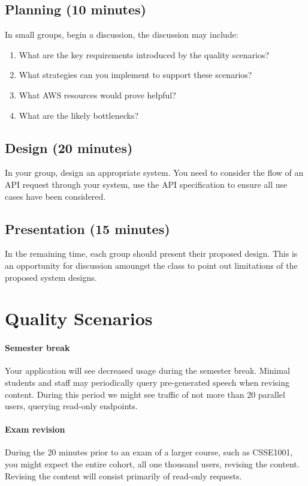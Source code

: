\documentclass{csse4400}
\begin{document}
\subsection*{Planning (10 minutes)}
In small groups, begin a discussion,
the discussion may include:

\begin{enumerate}
    \item What are the key requirements introduced by the quality scenarios?
    \item What strategies can you implement to support these scenarios?
    \item What AWS resources would prove helpful?
    \item What are the likely bottlenecks?
\end{enumerate}

\subsection*{Design (20 minutes)}

In your group, design an appropriate system.
You need to consider the flow of an API request through your system,
use the API specification to ensure all use cases have been considered.

\subsection*{Presentation (15 minutes)}

In the remaining time,
each group should present their proposed design.
This is an opportunity for discussion amoungst the class to point out limitations of the proposed system designs.

\section{Quality Scenarios}\label{sec:scenarios}

\paragraph{Semester break}
Your application will see decreased usage during the semester break.
Minimal students and staff may periodically query pre-generated speech when revising content.
During this period we might see traffic of not more than 20 parallel users,
querying read-only endpoints.

\paragraph{Exam revision}
During the 20 minutes prior to an exam of a larger course, such as CSSE1001,
you might expect the entire cohort, all one thousand users,
revising the content.
Revising the content will consist primarily of read-only requests.
\end{document}
